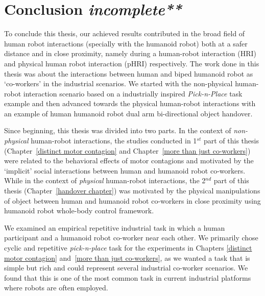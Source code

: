 
{\color{blue}\chapter*{Conclusion \textit{incomplete**}}}
\pagestyle{plain}

To conclude this thesis, our achieved results contributed in the broad field of human robot interactions (specially with the humanoid robot) both at a safer distance and in close proximity, namely during a human-robot interaction (HRI) and physical human robot interaction (pHRI) respectively. The work done in this thesis was about the interactions between human and biped humanoid robot as `co-workers' in the industrial scenarios. We started with the non-physical human-robot interaction scenario based on a industrially inspired \textit{Pick-n-Place} task example and then advanced towards the physical human-robot interactions with an example of human humanoid robot dual arm bi-directional object handover.

Since beginning, this thesis was divided into two parts. In the context of \textit{non-physical} human-robot interactions, the studies conducted in 1$^{st}$ part of this thesis (Chapter~\ref{distinct motor contagion} and Chapter~\ref{more than just co-workers}) were related to the behavioral effects of motor contagions and motivated by the `implicit' social interactions between human and humanoid robot co-workers. While in the context of \textit{physical} human-robot interactions, the 2$^{nd}$ part of this thesis (Chapter~\ref{handover chapter}) was motivated by the physical manipulations of object between human and humanoid robot co-workers in close proximity using humanoid robot whole-body control framework.

We examined an empirical repetitive industrial task in which a human participant and a humanoid robot co-worker near each other. We primarily chose cyclic and repetitive \textit{pick-n-place} task for the experiments in Chapters \ref{distinct motor contagion} and~\ref{more than just co-workers}, as we wanted a task that is simple but rich and could represent several industrial co-worker scenarios. We found that this is one of the most common task in current industrial platforms where robots are often employed.

